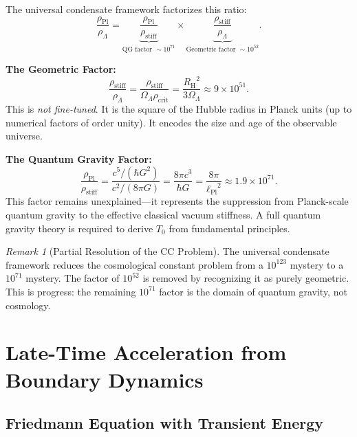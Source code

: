 \documentclass[11pt,a4paper]{article}
\newcommand{\lPl}{\ensuremath{\ell_{\mathrm{Pl}}}}
\newcommand{\rhocrit}{\ensuremath{\rho_{\mathrm{crit}}}}
\newcommand{\rhostiff}{\ensuremath{\rho_{\mathrm{stiff}}}}
\newcommand{\rhoPl}{\ensuremath{\rho_{\mathrm{Pl}}}}
\newcommand{\Tzero}{\ensuremath{T_0}}
\newcommand{\RH}{\ensuremath{R_{\mathrm{H}}}}
\newcommand{\OmegaLam}{\ensuremath{\Omega_\Lambda}}
\theoremstyle{definition}
\theoremstyle{remark}
\newtheorem{remark}[theorem]{Remark}
\begin{document}
The universal condensate framework factorizes this ratio:
\begin{equation}
\label{eq:cc_factorization}
\boxed{\frac{\rhoPl}{\rho_\Lambda} = \underbrace{\frac{\rhoPl}{\rhostiff}}_{\text{QG factor } \sim 10^{71}} \times \underbrace{\frac{\rhostiff}{\rho_\Lambda}}_{\text{Geometric factor } \sim 10^{52}}.}
\end{equation}

\textbf{The Geometric Factor:}
\begin{equation}
\frac{\rhostiff}{\rho_\Lambda} = \frac{\rhostiff}{\OmegaLam \rhocrit} = \frac{\RH^2}{3\OmegaLam} \approx 9 \times 10^{51}.
\end{equation}
This is \emph{not fine-tuned}. It is the square of the Hubble radius in Planck units (up to numerical factors of order unity). It encodes the size and age of the observable universe.

\textbf{The Quantum Gravity Factor:}
\begin{equation}
\frac{\rhoPl}{\rhostiff} = \frac{c^5/(\hbar G^2)}{c^2/(8\pi G)} = \frac{8\pi c^3}{\hbar G} = \frac{8\pi}{\lPl^2} \approx 1.9 \times 10^{71}.
\end{equation}
This factor remains unexplained---it represents the suppression from Planck-scale quantum gravity to the effective classical vacuum stiffness. A full quantum gravity theory is required to derive $\Tzero$ from fundamental principles.

\begin{remark}[Partial Resolution of the CC Problem]
The universal condensate framework reduces the cosmological constant problem from a $10^{123}$ mystery to a $10^{71}$ mystery. The factor of $10^{52}$ is removed by recognizing it as purely geometric. This is progress: the remaining $10^{71}$ factor is the domain of quantum gravity, not cosmology.
\end{remark}

\section{Late-Time Acceleration from Boundary Dynamics}
\label{sec:acceleration}

\subsection{Friedmann Equation with Transient Energy}
\label{sec:friedmann_transient}
\end{document}
